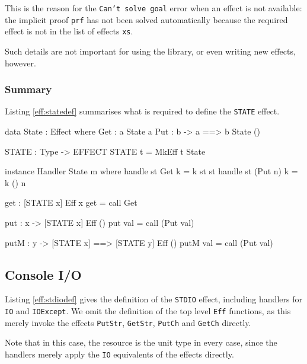 \noindent
This is the reason for the \texttt{Can't solve goal} error when an effect is
not available: the implicit proof \texttt{prf} has not been solved automatically
because the required effect is not in the list of effects \texttt{xs}.

Such details are not important for using the library, or even writing new
effects, however. 

\subsubsection*{Summary}

Listing \ref{eff:statedef} summarises what is required to define the
\texttt{STATE} effect.

\begin{code}[float=t,frame=single, caption={Complete State Effect Definition}, label=eff:statedef]
data State : Effect where
     Get :      { a }       State a
     Put : b -> { a ==> b } State () 

STATE : Type -> EFFECT
STATE t = MkEff t State

instance Handler State m where
     handle st Get     k = k st st
     handle st (Put n) k = k () n

get : { [STATE x] } Eff x
get = call Get

put : x -> { [STATE x] } Eff () 
put val = call (Put val)

putM : y -> { [STATE x] ==> [STATE y] } Eff () 
putM val = call (Put val)
\end{code}

\subsection{Console I/O}

Listing \ref{eff:stdiodef} gives the definition of the
\texttt{STDIO} effect, including handlers for \texttt{IO} and
\texttt{IOExcept}. We omit the definition of the top level \texttt{Eff}
functions, as this merely invoke the effects \texttt{PutStr}, \texttt{GetStr},
\texttt{PutCh} and \texttt{GetCh} directly.

Note that in this case, the resource is the unit type in every case, since
the handlers merely apply the \texttt{IO} equivalents of the effects
directly.

